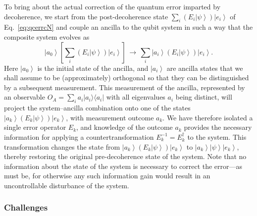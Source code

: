 \documentclass[3p,sort&compress]{elsarticle}
\newcommand{\ket}[1]{\left\vert{#1}\right\rangle}
\newcommand{\ketbra}[2]{\ensuremath{|{#1 \rangle}{\langle #2}|}}
\newcommand{\op}[1]{#1}
\begin{document}
To bring about the actual correction of the quantum error imparted by decoherence, we start from the post-decoherence state $\sum_{i}   \left( E_i \ket{\psi} \right) \ket{e_i}$ of Eq.~\eqref{eq:qcerrcN} and couple an ancilla to the qubit system in such a way that the composite system evolves as 
%
\begin{equation}\label{eq:errfsyn}
  \ket{a_0} \left[ \sum_{i} \left( E_i   \ket{\psi} \right)
    \ket{e_i} \right] \, \longrightarrow \, 
  \sum_{i} \ket{a_i} \left( E_i \ket{\psi} \right)
  \ket{e_i}.
\end{equation}
%
Here $\ket{a_0}$ is the initial state of the ancilla, and $\ket{a_i}$ are ancilla states that we shall assume to be (approximately) orthogonal so that they can be distinguished by a subsequent measurement. This measurement of the ancilla, represented by an observable  $\op{O}_A = \sum_i a_i \ketbra{a_i}{a_i}$ with all eigenvalues $a_i$ being distinct, will project the system--ancilla combination onto one of the states $\ket{a_k} \left( E_k \ket{\psi} \right) \ket{e_k}$, with measurement outcome $a_k$. We have therefore isolated a single error operator $E_k$, and knowledge of the outcome $a_k$ provides the necessary information for applying a countertransformation $E_k^{-1}=E_k^\dagger$ to the system. This transformation changes the state from $\ket{a_k} \left( E_k \ket{\psi} \right) \ket{e_k}$ to $\ket{a_k} \ket{\psi} \ket{e_k}$, thereby restoring the original pre-decoherence state of the system. Note that no information about the state of the system is necessary to correct the error---as must be, for otherwise any such information gain would result in an uncontrollable disturbance of the system.

\subsubsection{Challenges}
\end{document}
